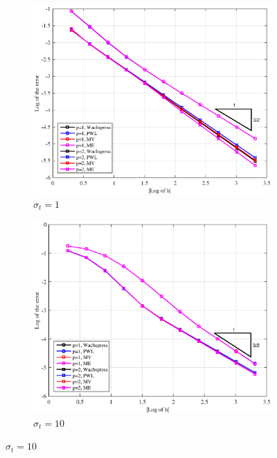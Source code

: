 \begin{figure}
\centering
{
	\begin{subfigure}[b]{0.485\textwidth}
		\centering
		\label{subfig::PA_LeftTop_Cart_sig1}
		\includegraphics[width=\textwidth]{figures/sec_BF/PAErr_LeftTop_Cart_sig1.eps}
	\caption{$\sigma_t = 1$}
	\end{subfigure}
	\hfill
	\begin{subfigure}[b]{0.485\textwidth}
		\centering
		\label{subfig::PA_LeftTop_Cart_sig10}
		\includegraphics[width=\textwidth]{figures/sec_BF/PAErr_LeftTop_Cart_sig10.eps}
	\caption{$\sigma_t = 10$}
	\end{subfigure}
}
\end{figure}
